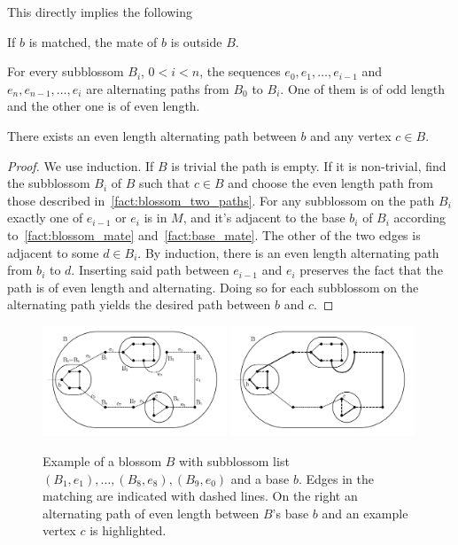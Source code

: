 This directly implies the following

\begin{fact}\label{fact:base_mate}
    If $b$ is matched, the mate of $b$ is outside $B$.
\end{fact}

\begin{fact}\label{fact:blossom_two_paths}
    For every subblossom $B_i$, $0 < i < n$, the sequences $e_0, e_1, \dots, e_{i-1}$ and $e_n, e_{n-1}, \dots, e_i$ are alternating paths from $B_0$ to $B_i$. One of them is of odd length and the other one is of even length.
\end{fact}

\begin{fact}
    There exists an even length alternating path between $b$ and any vertex $c \in B$.

\begin{proof}
    We use induction. If $B$ is trivial the path is empty. If it is non-trivial, find the subblossom $B_i$ of $B$ such that $c \in B$ and choose the even length path from those described in~\ref{fact:blossom_two_paths}. For any subblossom on the path $B_i$ exactly one of $e_{i-1}$ or $e_{i}$ is in $M$, and it's adjacent to the base $b_i$ of $B_i$ according to~\ref{fact:blossom_mate} and~\ref{fact:base_mate}. The other of the two edges is adjacent to some $d \in B_i$. By induction, there is an even length alternating path from $b_i$ to $d$. Inserting said path between $e_{i-1}$ and $e_i$ preserves the fact that the path is of even length and alternating. Doing so for each subblossom on the alternating path yields the desired path between $b$ and $c$.
\end{proof}
\end{fact}

\begin{figure}
    \centering
    \includegraphics*[width=0.49\textwidth]{figures/Basic Blossom.png}
    \includegraphics*[width=0.49\textwidth]{figures/Blossom alternating clean.png}
    \caption{Example of a blossom $B$ with subblossom list $(B_1, e_1), \dots, (B_8, e_8), (B_9, e_0)$ and a base $b$. Edges in the matching are indicated with dashed lines. On the right an alternating path of even length between $B$'s base $b$ and an example vertex $c$ is highlighted.}\label{fig:odd_expansion}
\end{figure}

